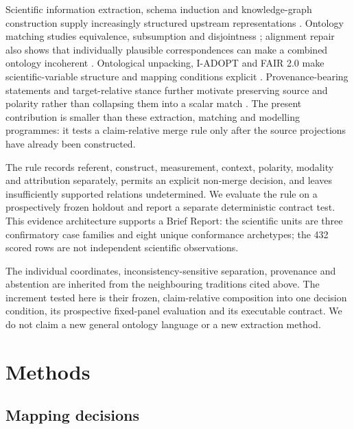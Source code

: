 Scientific information extraction, schema induction and knowledge-graph
construction supply increasingly structured upstream representations
\cite{muse2026,scier2024,scischema2026,scopes2026,schemaContracts2026}.
Ontology matching studies equivalence, subsumption and disjointness
\cite{euzenat2007ontology}; alignment repair also shows that individually
plausible correspondences can make a combined ontology incoherent
\cite{santos2015alignment}. Ontological unpacking, I-ADOPT and FAIR 2.0 make
scientific-variable structure and mapping conditions explicit
\cite{bernasconi2022interoperability,iadopt2021,fair2024}.
Provenance-bearing statements and target-relative stance further motivate
preserving source and polarity rather than collapsing them into a scalar match
\cite{dec2026,hardalov2022stance}. The present contribution is smaller than
these extraction, matching and modelling programmes: it tests a claim-relative
merge rule only after the source projections have already been constructed.

The rule records referent, construct, measurement, context, polarity, modality
and attribution separately, permits an explicit non-merge decision, and leaves
insufficiently supported relations undetermined. We evaluate the rule on a
prospectively frozen holdout and report a separate deterministic contract test.
This evidence architecture supports a Brief Report: the scientific units are
three confirmatory case families and eight unique conformance archetypes; the
432 scored rows are not independent scientific observations.

The individual coordinates, inconsistency-sensitive separation, provenance and
abstention are inherited from the neighbouring traditions cited above. The
increment tested here is their frozen, claim-relative composition into one
decision condition, its prospective fixed-panel evaluation and its executable
contract. We do not claim a new general ontology language or a new extraction
method.

\section{Methods}

\subsection{Mapping decisions}


